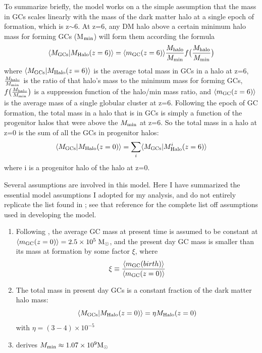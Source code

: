 \documentclass[onecolumn]{aastex62}
\begin{document}
To summarize briefly, the model works on a the simple assumption that the mass in GCs scales linearly with the mass of the dark matter halo at a single epoch of formation, which is z$\sim$6.  At z=6, any DM halo above a certain minimum halo mass for forming GCs (M$_{\rm{min}}$) will form them according the formula
\begin{equation}
    \langle M_{\rm{GCs}} | M_{\rm{Halo}}(z=6) \rangle = \langle m_{\rm{GC}}(z=6)\rangle \frac{M_{\rm{halo}}}{M_{\rm{min}}} f\big( \frac{M_{\rm{halo}}}{M_{\rm{min}}} \big)
\end{equation}
where $\langle M_{\rm{GCs}} | M_{\rm{Halo}}(z=6) \rangle$ is the average total mass in GCs in a halo at z=6, $\frac{M_{\rm{halo}}}{M_{\rm{min}}}$ is the ratio of that halo's mass to the minimum mass for forming GCs, $f\big( \frac{M_{\rm{halo}}}{M_{\rm{min}}} \big)$ is a suppression function of the halo/min mass ratio, and $\langle m_{\rm{GC}}(z=6)\rangle$ is the average mass of a single globular cluster at z=6.  Following the epoch of GC formation, the total mass in a halo that is in GCs is simply a function of the progenitor halos that were above the $M_{\rm{min}}$ at z=6.  So the total mass in a halo at z=0 is the sum of all the GCs in progenitor halos:
\begin{equation}
    \langle M_{\rm{GCs}} | M_{\rm{Halo}}(z=0) \rangle = \sum_i \langle M_{\rm{GCs}} | M^i_{\rm{Halo}}(z=6) \rangle
\end{equation}
where i is a progenitor halo of the halo at z=0.

Several assumptions are involved in this model.  Here I have summarized the essential model assumptions I adopted for my analysis, and do not entirely replicate the list found in ; see that reference for the complete list off assumptions used in developing the model. 
\begin{enumerate}
    \item Following \cite{Harris2017}, the average GC mass at present time  is assumed to be constant at $\langle m_{\rm{GC}}(z=0)\rangle = 2.5 \times 10^5 \;\rm{M}_\odot$, and the present day GC mass is smaller than its mass at formation by some factor $\xi$, where
    \begin{equation}
        \xi  \equiv \frac{\langle m_{\rm{GC}}(birth)\rangle}{\langle m_{\rm{GC}}(z=0)\rangle}
    \end{equation}

    \item The total mass in present day GCs is a constant fraction of the dark matter halo mass:
    \begin{equation}
        \langle M_{\rm{GCs}} | M_{\rm{Halo}}(z=0) \rangle = \eta  M_{\rm{Halo}}(z=0)
    \end{equation}
    with $\eta = (3-4) \times 10^{-5}$ \citep[e.g.][]{Harris2017}
    
    \item {} derives $M_{\rm{min}}\approx 1.07\times10^{9} \rm{M}_\odot$

\end{enumerate}
\end{document}
